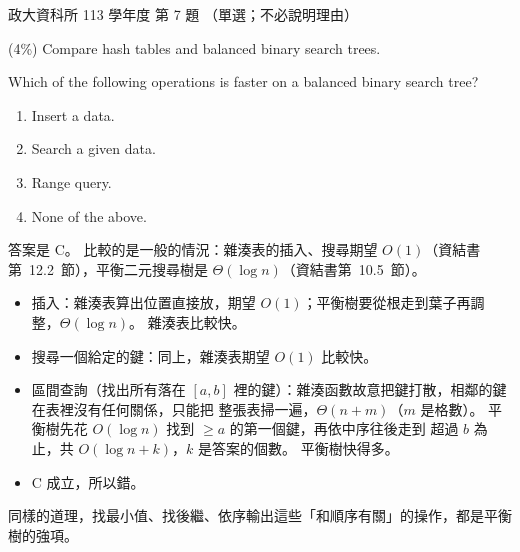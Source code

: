 \begin{pastexam}[label={px:nccu-113-dsa-07}]{政大資科所 113 學年度 第 7 題}
（單選；不必說明理由）

(4\%) Compare hash tables and balanced binary search trees.

Which of the following operations is faster on a balanced binary search tree?
\begin{enumerate}[label=\Alph*.]
\item Insert a data.
\item Search a given data.
\item Range query.
\item None of the above.
\end{enumerate}
\end{pastexam}

\begin{pastsoln}
答案是 C。 比較的是一般的情況：雜湊表的插入、搜尋期望 $O(1)$（資結書第~12.2~節），平衡二元搜尋樹是
$\Theta(\log n)$（資結書第~10.5~節）。

\begin{itemize}
\item[A.] 插入：雜湊表算出位置直接放，期望 $O(1)$；平衡樹要從根走到葉子再調整，$\Theta(\log n)$。 雜湊表比較快。
\item[B.] 搜尋一個給定的鍵：同上，雜湊表期望 $O(1)$ 比較快。
\item[C.] 區間查詢（找出所有落在 $[a, b]$ 裡的鍵）：雜湊函數故意把鍵打散，相鄰的鍵在表裡沒有任何關係，只能把
整張表掃一遍，$\Theta(n + m)$（$m$ 是格數）。 平衡樹先花 $O(\log n)$ 找到 $\ge a$ 的第一個鍵，再依中序往後走到
超過 $b$ 為止，共 $O(\log n + k)$，$k$ 是答案的個數。 平衡樹快得多。
\item[D.] C 成立，所以錯。
\end{itemize}
同樣的道理，找最小值、找後繼、依序輸出這些「和順序有關」的操作，都是平衡樹的強項。
\end{pastsoln}
